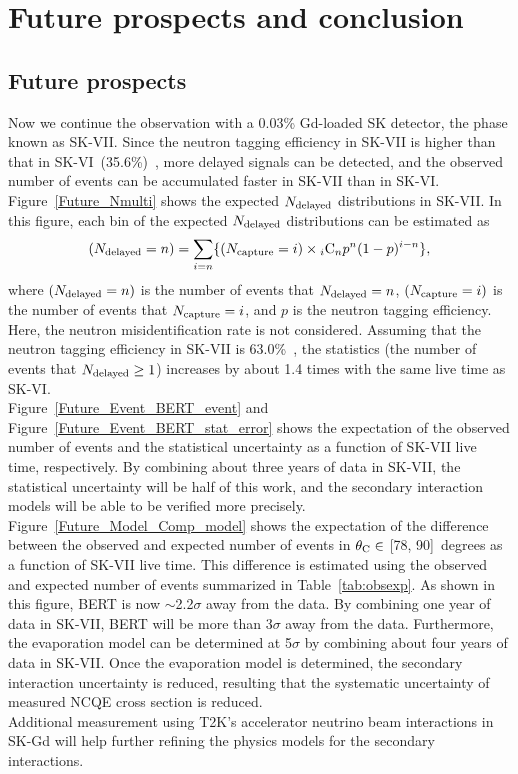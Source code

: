 

\section{Future prospects and conclusion}\label{Sec_Conclusion}
\subsection{Future prospects}
\vs\hs
Now we continue the observation with a 0.03\% Gd-loaded SK detector, the phase known as SK-VII.
Since the neutron tagging efficiency in SK-VII is higher than that in SK-VI~(35.6\%)~\cite{2023Harada,2022Harada}, more delayed signals can be detected, and the observed number of events can be accumulated faster in SK-VII than in SK-VI.
Figure~\ref{Future_Nmulti} shows the expected $N_{\rm delayed}$ distributions in SK-VII.
In this figure, each bin of the expected $N_{\rm delayed}$ distributions can be estimated as
\begin{eqnarray}
	(N_{\rm delayed} = n) = \sum_{i=n} \{(N_{\rm capture} = i) \times {}_{i}{\rm C}_{n}p^{n}(1 - p)^{i - n}\},
\end{eqnarray}
where $(N_{\rm delayed} = n)$ is the number of events that $N_{\rm delayed} = n$, $(N_{\rm capture} = i)$ is the number of events that $N_{\rm capture} = i$, and $p$ is the neutron tagging efficiency.
Here, the neutron misidentification rate is not considered.
Assuming that the neutron tagging efficiency in SK-VII is 63.0\%~\cite{2023KanemuraSlide}, the statistics (the number of events that $N_{\rm delayed} \geq 1$) increases by about 1.4 times with the same live time as SK-VI.\\
\hs
Figure~\ref{Future_Event_BERT_event} and Figure~\ref{Future_Event_BERT_stat_error} shows the expectation of the observed number of events and the statistical uncertainty as a function of SK-VII live time, respectively.
By combining about three years of data in SK-VII, the statistical uncertainty will be half of this work, and the secondary interaction models will be able to be verified more precisely.\\
\hs
Figure~\ref{Future_Model_Comp_model} shows the expectation of the difference between the observed and expected number of events in $\theta_{\rm C}\in$ [78, 90]~degrees as a function of SK-VII live time.
This difference is estimated using the observed and expected number of events summarized in Table~\ref{tab:obsexp}.
As shown in this figure, BERT is now $\sim$2.2$\sigma$ away from the data.
By combining one year of data in SK-VII, BERT will be more than 3$\sigma$ away from the data.
Furthermore, the evaporation model can be determined at 5$\sigma$ by combining about four years of data in SK-VII.
Once the evaporation model is determined, the secondary interaction uncertainty is reduced, resulting that the systematic uncertainty of measured NCQE cross section is reduced.\\
\hs
Additional measurement using T2K's accelerator neutrino beam interactions in SK-Gd will help further refining the physics models for the secondary interactions.

